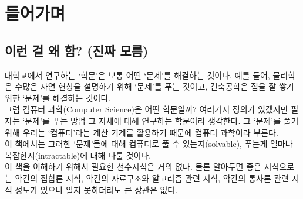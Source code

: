 \documentclass[b5paper, 11pt]{book}
\theoremstyle{definition}
\begin{document}
\chapter{들어가며}
\section{이런 걸 왜 함? (진짜 모름)}
대학교에서 연구하는 `학문'은 보통 어떤 `문제'를 해결하는 것이다. 예를 들어, 물리학은 수많은 자연 현상을 설명하기 위해 `문제'를 푸는 것이고, 건축공학은 집을 잘 쌓기 위한 `문제'를 해결하는 것이다. \\
그럼 컴퓨터 과학(Computer Science)은 어떤 학문일까? 여러가지 정의가 있겠지만 필자는 `문제'를 푸는 방법 그 자체에 대해 연구하는 학문이라 생각한다. 그 `문제'를 풀기 위해 우리는 `컴퓨터'라는 계산 기계를 활용하기 때문에 컴퓨터 과학이라 부른다.\\
이 책에서는 그러한 `문제'들에 대해 컴퓨터로 풀 수 있는지(solvable), 푸는게 얼마나 복잡한지(intractable)에 대해 다룰 것이다. \\
이 책을 이해하기 위해서 필요한 선수지식은 거의 없다. 물론 알아두면 좋은 지식으로는 약간의 집합론 지식, 약간의 자료구조와 알고리즘 관련 지식, 약간의 통사론 관련 지식 정도가 있으나 알지 못하더라도 큰 상관은 없다.
\end{document}
